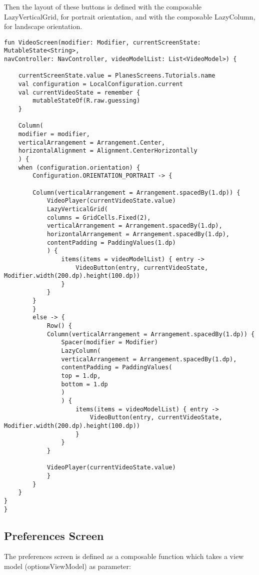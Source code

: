 Then the layout of these buttons is defined with the composable LazyVerticalGrid, for portrait orientation, and with the composable LazyColumn, for landscape orientation.

\begin{lstlisting}
fun VideoScreen(modifier: Modifier, currentScreenState: MutableState<String>,
navController: NavController, videoModelList: List<VideoModel>) {
	
	currentScreenState.value = PlanesScreens.Tutorials.name
	val configuration = LocalConfiguration.current
	val currentVideoState = remember {
		mutableStateOf(R.raw.guessing)
	}
	
	Column(
	modifier = modifier,
	verticalArrangement = Arrangement.Center,
	horizontalAlignment = Alignment.CenterHorizontally
	) {
	when (configuration.orientation) {
		Configuration.ORIENTATION_PORTRAIT -> {
			
		Column(verticalArrangement = Arrangement.spacedBy(1.dp)) {
			VideoPlayer(currentVideoState.value)
			LazyVerticalGrid(
			columns = GridCells.Fixed(2),
			verticalArrangement = Arrangement.spacedBy(1.dp),
			horizontalArrangement = Arrangement.spacedBy(1.dp),
			contentPadding = PaddingValues(1.dp)
			) {
				items(items = videoModelList) { entry ->
					VideoButton(entry, currentVideoState, Modifier.width(200.dp).height(100.dp))
				}
			}
		}
		}
		else -> {
			Row() {
			Column(verticalArrangement = Arrangement.spacedBy(1.dp)) {
				Spacer(modifier = Modifier)
				LazyColumn(
				verticalArrangement = Arrangement.spacedBy(1.dp),
				contentPadding = PaddingValues(
				top = 1.dp,
				bottom = 1.dp
				)
				) {
					items(items = videoModelList) { entry ->
						VideoButton(entry, currentVideoState, Modifier.width(200.dp).height(100.dp))
					}
				}
			}
			
			VideoPlayer(currentVideoState.value)
			}
		}
	}
}
}
\end{lstlisting}

\subsection{Preferences Screen}

The preferences screen is defined as a composable function which takes a view model (optionsViewModel) as parameter:

